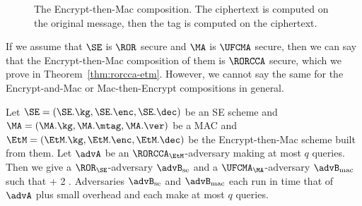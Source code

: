 \begin{figure}[h]
	\centering
	\caption{The Encrypt-then-Mac composition. The ciphertext is computed on the original message, then the tag is computed on the ciphertext.}
\end{figure}

If we assume that $\SE$ is $\ROR$ secure and $\MA$ is $\UFCMA$ secure, then we can say that the Encrypt-then-Mac composition of them is $\RORCCA$ secure, which we prove in Theorem~\ref{thm:rorcca-etm}. However, we cannot say the same for the Encrypt-and-Mac or Mac-then-Encrypt compositions in general. 

\begin{theorem}
Let $\SE=(\SE.\kg,\SE.\enc,\SE.\dec)$ be an SE scheme and $\MA=(\MA.\kg,\MA.\mtag,\MA.\ver)$ be a MAC and $\EtM=(\EtM.\kg,\EtM.\enc,\EtM.\dec)$ be the Encrypt-then-Mac
scheme built from them.  Let $\advA$ be an $\RORCCA_\EtM$-adversary making at most
$q$ queries. Then we give a $\ROR_\SE$-adversary $\advB_{\textrm{se}}$ 
and a $\UFCMA_\MA$-adversary  $\advB_\textrm{mac}$ 
such that
\bnm
  \AdvRORCCA{\EtM}{\advA} \le {} + 2\cdotsm{} \;.
\enm
Adversaries $\advB_\textrm{se}$ and $\advB_{\textrm{mac}}$ each run in time that of 
$\advA$ plus small overhead and each make at most $q$ queries.
\label{thm:rorcca-etm}
\end{theorem}

